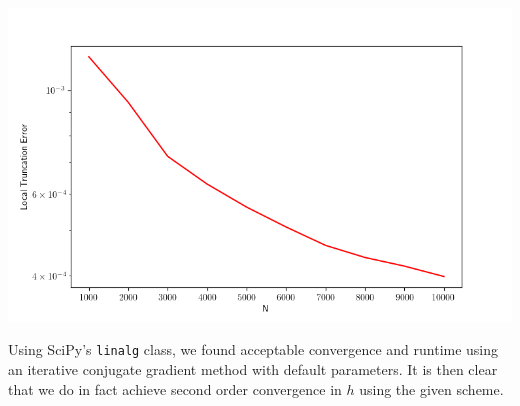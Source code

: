 \documentclass[11pt,reqno]{amsart}
\newcommand{\code}{\texttt}
\begin{document}
\begin{itemize}
    \begin{center}
        \includegraphics[scale=.7]{Figure_1.png}
    \end{center}\newline

    \noindent Using SciPy's \code{linalg} class, we found acceptable convergence and runtime using an iterative conjugate gradient method with default parameters. It is then clear that we do in fact achieve second order convergence in $h$ using the given scheme.    
\end{itemize}
\end{document}
